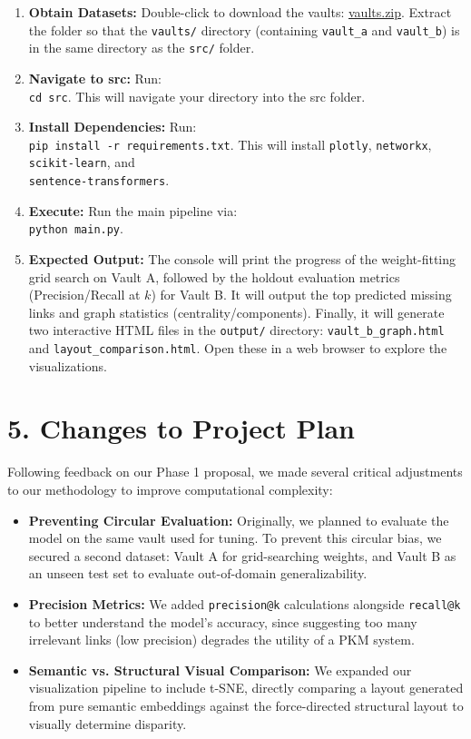 \documentclass[fontsize=11pt]{article}
\begin{document}
\begin{enumerate}
    \item \textbf{Obtain Datasets:} Double-click to download the vaults: \href{https://github.com/joshuaspiral/minks/releases/download/v1.0.0/vaults.zip}{vaults.zip}. Extract the folder so that the \texttt{vaults/} directory (containing \texttt{vault\_a} and \texttt{vault\_b}) is in the same directory as the \texttt{src/} folder.
    \item \textbf{Navigate to src:} Run: \\ \texttt{cd src}. This will navigate your directory into the src folder.
    \item \textbf{Install Dependencies:} Run: \\ \texttt{pip install -r requirements.txt}. This will install \texttt{plotly}, \texttt{networkx}, \texttt{scikit-learn}, and\\ \texttt{sentence-transformers}.
    \item \textbf{Execute:} Run the main pipeline via: \\ \texttt{python main.py}.
    \item \textbf{Expected Output:} The console will print the progress of the weight-fitting grid search on Vault A, followed by the holdout evaluation metrics (Precision/Recall at $k$) for Vault B. It will output the top predicted missing links and graph statistics (centrality/components). Finally, it will generate two interactive HTML files in the \texttt{output/} directory: \texttt{vault\_b\_graph.html} and \texttt{layout\_comparison.html}. Open these in a web browser to explore the visualizations.
\end{enumerate}

\section*{5. Changes to Project Plan}

Following feedback on our Phase 1 proposal, we made several critical adjustments to our methodology to improve computational complexity:
\begin{itemize}
    \item \textbf{Preventing Circular Evaluation:} Originally, we planned to evaluate the model on the same vault used for tuning. To prevent this circular bias, we secured a second dataset: Vault A for grid-searching weights, and Vault B as an unseen test set to evaluate out-of-domain generalizability.
    \item \textbf{Precision Metrics:} We added \texttt{precision@k} calculations alongside \texttt{recall@k} to better understand the model's accuracy, since suggesting too many irrelevant links (low precision) degrades the utility of a PKM system. 
    \item \textbf{Semantic vs. Structural Visual Comparison:} We expanded our visualization pipeline to include t-SNE, directly comparing a layout generated from pure semantic embeddings against the force-directed structural layout to visually determine disparity.
\end{itemize}
\end{document}

